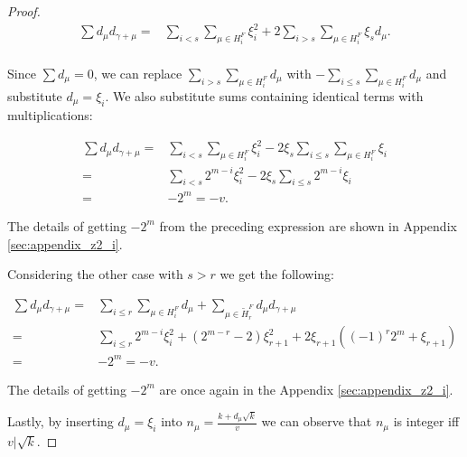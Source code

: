 \begin{proof}
    \begin{equation}
        \begin{split}
            \sum d_\mu d_{\gamma+\mu}
              = & \sum\limits_{i<s} \sum\limits_{\mu \in H_i^F} \xi_i^2
                + 2\sum\limits_{i>s} \sum\limits_{\mu \in H_i^F} \xi_s d_\mu. \\
        \end{split}
    \end{equation}
    
	Since $\sum d_{\mu} = 0$, we can replace $\sum_{i>s} \sum_{\mu \in H_i^F} d_\mu$ with $-\sum_{i\leq s} \sum_{\mu \in H_i^F} d_\mu$ and substitute $d_\mu=\xi_i$.
	We also substitute sums containing identical terms with multiplications:
    
	\begin{equation}
        \label{z2i:eq:appendixable1}
        \begin{split}
            \sum d_\mu d_{\gamma+\mu}
              = & \sum\limits_{i<s} \sum\limits_{\mu \in H_i^F} \xi_i^2
                - 2 \xi_s \sum\limits_{i \leq s} \sum\limits_{\mu \in H_i^F} \xi_i \\
              = & \sum\limits_{i<s} 2^{m-i} \xi_i^2
                - 2 \xi_s \sum\limits_{i \leq s}  2^{m-i} \xi_i \\
              = & -2^m = - v.
        \end{split}
	\end{equation}
	
	The details of getting $-2^m$ from the preceding expression are 
	shown in Appendix \ref{sec:appendix_z2_i}.

    Considering the other case with $s > r$ we get the following:
    
    \begin{equation}
        \label{z2i:eq:appendixable2}
        \begin{split}
            \sum d_\mu d_{\gamma+\mu}
              = & \sum\limits_{i \leq r} \sum\limits_{\mu \in H_i^F} d_\mu
                + \sum\limits_{\mu \in \widetilde H_r^F} d_\mu d_{\gamma + \mu} \\
              = & \sum\limits_{i\leq r} 2^{m-i} \xi_i^2
                + (2^{m-r}-2) \xi_{r+1}^2 + 2\xi_{r+1}((-1)^r 2^m + \xi_{r+1}) \\
              = & -2^m = -v.
        \end{split}
	\end{equation}
	
	The details of getting $-2^m$ are once again in the Appendix \ref{sec:appendix_z2_i}.
    
    Lastly, by inserting $d_\mu = \xi_i$ into $n_\mu=\frac{k+d_\mu \sqrt k}v$ we can observe that $n_\mu$ is integer iff $v | \sqrt k$.
\end{proof}


